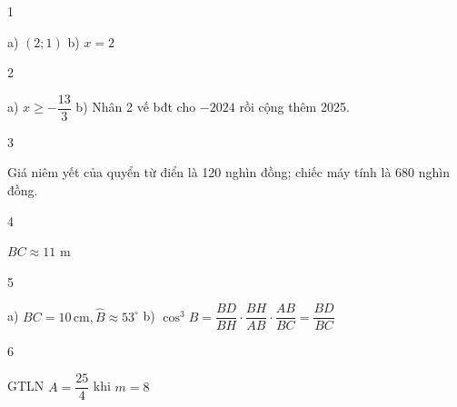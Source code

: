 \begin{Solbook}{1}
 \par \noindent  a) $(2;1)$ \hspace {2cm} b) $x=2$  \hfill \qedEX 
\end{Solbook}
\begin{Solbook}{2}
 \par \noindent  a) $x\ge -\dfrac {13}{3}$ \hfill b) Nhân 2 vế bđt cho $-2024$ rồi cộng thêm 2025. \hfill  \hfill \qedEX 
\end{Solbook}
\begin{Solbook}{3}
 \par \noindent  Giá niêm yết của quyển từ điển là 120 nghìn đồng; chiếc máy tính là 680 nghìn đồng.  \hfill \qedEX 
\end{Solbook}
\begin{Solbook}{4}
 \par \noindent $BC\approx 11$ m  \hfill \qedEX 
\end{Solbook}
\begin{Solbook}{5}
 \par \noindent a) $BC=10\,\text {cm},\widehat {B}\approx 53^\circ $ \hfill b) $\cos ^3B=\dfrac {BD}{BH}\cdot \dfrac {BH}{AB}\cdot \dfrac {AB}{BC}=\dfrac {BD}{BC}$\hfill  \hfill \qedEX 
\end{Solbook}
\begin{Solbook}{6}
 \par \noindent  GTLN $A=\dfrac {25}{4}$ khi $m=8$ \hfill \qedEX 
\end{Solbook}
